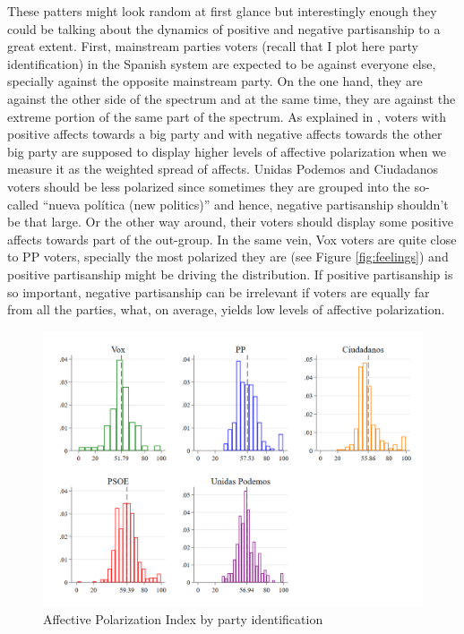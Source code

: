 \documentclass[a4paper, svgnames]{article}
\begin{document}
These patters might look random at first glance but interestingly enough they could be talking about the dynamics of positive and negative partisanship to a great extent. First, mainstream parties voters (recall that I plot here party identification) in the Spanish system are expected to be against everyone else, specially against the opposite mainstream party. On the one hand, they are against the other side of the spectrum and at the same time, they are against the extreme portion of the same part of the spectrum. As explained in \citet*{Wagner2021}, voters with positive affects towards a big party and with negative affects towards the other big party are supposed to display higher levels of affective polarization when we measure it as the weighted spread of affects. Unidas Podemos and Ciudadanos voters should be less polarized since sometimes they are grouped into the so-called ``nueva política (new politics)'' and hence, negative partisanship shouldn't be that large. Or the other way around, their voters should display some positive affects towards part of the out-group. In the same vein, Vox voters are quite close to PP voters, specially the most polarized they are (see Figure \ref*{fig:feelings}) and positive partisanship might be driving the distribution. If positive partisanship is so important, negative partisanship can be irrelevant if voters are equally far from all the parties, what, on average, yields low levels of affective polarization.

\begin{figure}[H]
	\centering
	\includegraphics[scale=0.30]{Figures/AP_index_by_party_id.png}
	\caption{\label{fig:AP_party_id} Affective Polarization Index by party identification}
\end{figure}
\end{document}
